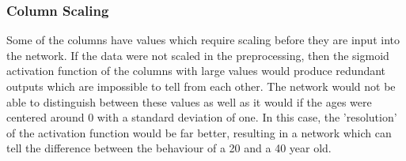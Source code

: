         \subsubsection{Column Scaling}
            Some of the columns have values which require scaling before they are input into the network. If the data were not scaled in the preprocessing, then the sigmoid activation function %
            of the columns with large values would produce redundant outputs which are impossible to tell from each other. The network would not be able to distinguish between these values as well as it would if the ages were centered around 0 with a standard deviation of one. %
            In this case, the 'resolution' of the activation function 
            would be far better, resulting in a network which can tell the difference between the behaviour of a 20 and a 40 year old.
